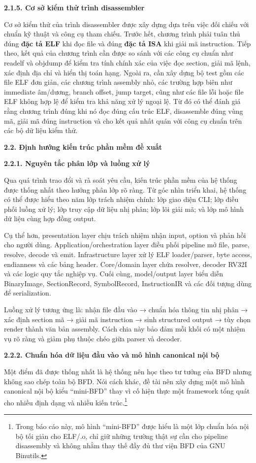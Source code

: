 \documentclass[
]{article}
\begin{document}
\textbf{2.1.5. Cơ sở kiểm thử trình disassembler}

Cơ sở kiểm thử của trình disassembler được xây dựng dựa trên việc đối
chiếu với chuẩn kỹ thuật và công cụ tham chiếu. Trước hết, chương trình
phải tuân thủ đúng \textbf{đặc tả ELF} khi đọc file và đúng \textbf{đặc
tả ISA} khi giải mã instruction. Tiếp theo, kết quả của chương trình cần
được so sánh với các công cụ chuẩn như readelf và objdump để kiểm tra
tính chính xác của việc đọc section, giải mã lệnh, xác định địa chỉ và
hiển thị toán hạng. Ngoài ra, cần xây dựng bộ test gồm các file ELF đơn
giản, các chương trình assembly nhỏ, các trường hợp biên như immediate
âm/dương, branch offset, jump target, cũng như các file lỗi hoặc file
ELF không hợp lệ để kiểm tra khả năng xử lý ngoại lệ. Từ đó có thể đánh
giá rằng chương trình đúng khi nó đọc đúng cấu trúc ELF, disassemble
đúng vùng mã, giải mã đúng instruction và cho kết quả nhất quán với công
cụ chuẩn trên các bộ dữ liệu kiểm thử.

\textbf{2.2. Định hướng kiến trúc phần mềm đề xuất}

\textbf{2.2.1. Nguyên tắc phân lớp và luồng xử lý}

Qua quá trình trao đổi và rà soát yêu cầu, kiến trúc phần mềm của hệ
thống được thống nhất theo hướng phân lớp rõ ràng. Từ góc nhìn triển
khai, hệ thống có thể được hiểu theo năm lớp trách nhiệm chính: lớp giao
diện CLI; lớp điều phối luồng xử lý; lớp truy cập dữ liệu nhị phân; lớp
lõi giải mã; và lớp mô hình dữ liệu cùng hợp đồng output.

Cụ thể hơn, presentation layer chịu trách nhiệm nhận input, option và
phản hồi cho người dùng. Application/orchestration layer điều phối
pipeline mở file, parse, resolve, decode và emit. Infrastructure layer
xử lý ELF loader/parser, byte access, endianness và các bảng header.
Core/domain layer chứa resolver, decoder RV32I và các logic quy tắc
nghiệp vụ. Cuối cùng, model/output layer biểu diễn BinaryImage,
SectionRecord, SymbolRecord, InstructionIR và các đối tượng dùng để
serialization.

Luồng xử lý tương ứng là: nhận file đầu vào → chuẩn hóa thông tin nhị
phân → xác định section mã → giải mã instruction → sinh structured
output → tùy chọn render thành văn bản assembly. Cách chia này bảo đảm
mỗi khối có một nhiệm vụ rõ ràng và giảm phụ thuộc chéo giữa parser và
decoder.

\textbf{2.2.2. Chuẩn hóa dữ liệu đầu vào và mô hình canonical nội bộ}

Một điểm đã được thống nhất là hệ thống nên học theo tư tưởng của BFD
nhưng không sao chép toàn bộ BFD. Nói cách khác, đề tài nên xây dựng một
mô hình canonical nội bộ kiểu ``mini-BFD'' thay vì cố hiện thực một
framework tổng quát cho nhiều định dạng và nhiều kiến trúc.\footnote{Trong
  báo cáo này, mô hình ``mini-BFD'' được hiểu là một lớp chuẩn hóa nội
  bộ tối giản cho ELF/.o, chỉ giữ những trường thật sự cần cho pipeline
  disassembly và không nhằm thay thế đầy đủ thư viện BFD của GNU
  Binutils.}
\end{document}
